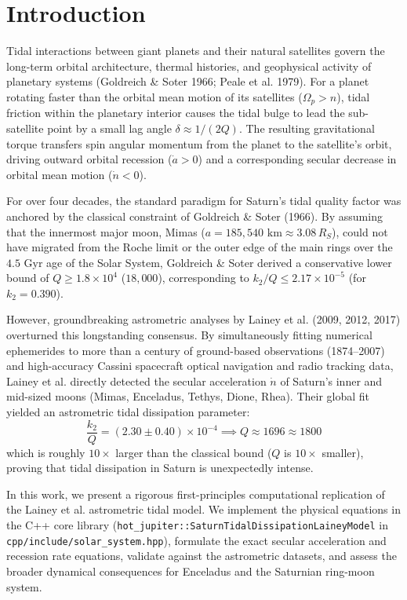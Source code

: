 \documentclass[11pt,a4paper]{article}
\begin{document}
\section{Introduction}
Tidal interactions between giant planets and their natural satellites govern the long-term orbital architecture, thermal histories, and geophysical activity of planetary systems (Goldreich \& Soter 1966; Peale et al. 1979). For a planet rotating faster than the orbital mean motion of its satellites ($\Omega_p > n$), tidal friction within the planetary interior causes the tidal bulge to lead the sub-satellite point by a small lag angle $\delta \approx 1/(2Q)$. The resulting gravitational torque transfers spin angular momentum from the planet to the satellite's orbit, driving outward orbital recession ($\dot{a} > 0$) and a corresponding secular decrease in orbital mean motion ($\dot{n} < 0$).

For over four decades, the standard paradigm for Saturn's tidal quality factor was anchored by the classical constraint of Goldreich \& Soter (1966). By assuming that the innermost major moon, Mimas ($a = 185{,}540\text{ km} \approx 3.08\,R_S$), could not have migrated from the Roche limit or the outer edge of the main rings over the $4.5\text{ Gyr}$ age of the Solar System, Goldreich \& Soter derived a conservative lower bound of $Q \ge 1.8 \times 10^4$ ($18{,}000$), corresponding to $k_2 / Q \le 2.17 \times 10^{-5}$ (for $k_2 = 0.390$).

However, groundbreaking astrometric analyses by Lainey et al. (2009, 2012, 2017) overturned this longstanding consensus. By simultaneously fitting numerical ephemerides to more than a century of ground-based observations (1874--2007) and high-accuracy Cassini spacecraft optical navigation and radio tracking data, Lainey et al. directly detected the secular acceleration $\dot{n}$ of Saturn's inner and mid-sized moons (Mimas, Enceladus, Tethys, Dione, Rhea). Their global fit yielded an astrometric tidal dissipation parameter:
\begin{equation}
\frac{k_2}{Q} = (2.30 \pm 0.40) \times 10^{-4} \implies Q \approx 1696 \approx 1800
\end{equation}
which is roughly $10\times$ larger than the classical bound ($Q$ is $10\times$ smaller), proving that tidal dissipation in Saturn is unexpectedly intense.

In this work, we present a rigorous first-principles computational replication of the Lainey et al. astrometric tidal model. We implement the physical equations in the C++ core library (\texttt{hot\_jupiter::SaturnTidalDissipationLaineyModel} in \texttt{cpp/include/solar\_system.hpp}), formulate the exact secular acceleration and recession rate equations, validate against the astrometric datasets, and assess the broader dynamical consequences for Enceladus and the Saturnian ring-moon system.
\end{document}
